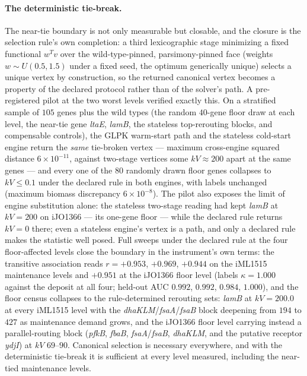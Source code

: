 \documentclass[11pt,a4paper]{article}
\theoremstyle{plain}
\theoremstyle{definition}
\theoremstyle{remark}
\begin{document}
\paragraph{The deterministic tie-break.}
The near-tie boundary is not only measurable but closable, and the
closure is the selection rule's own completion: a third
lexicographic stage minimizing a fixed functional $w^{T}v$ over the
wild-type-pinned, parsimony-pinned face (weights
$w\sim U(0.5,1.5)$ under a fixed seed, the optimum generically
unique) selects a unique vertex by construction, so the returned
canonical vertex becomes a property of the declared protocol rather
than of the solver's path. A pre-registered pilot at the two worst
levels verified exactly this. On a stratified sample of $105$ genes
plus the wild types (the random $40$-gene floor draw at each level,
the near-tie gene \emph{ltaE}, \emph{lamB}, the stateless
top-rerouting blocks, and compensable controls), the GLPK
warm-start path and the stateless cold-start engine return the
\emph{same} tie-broken vertex --- maximum cross-engine squared
distance $6\times10^{-11}$, against two-stage vertices some
$kV\approx200$ apart at the same genes --- and every one of the
$80$ randomly drawn floor genes collapses to $kV\le0.1$ under the
declared rule in both engines, with labels unchanged (maximum
biomass discrepancy $6\times10^{-8}$). The pilot also exposes the
limit of engine substitution alone: the stateless two-stage reading
had kept \emph{lamB} at $kV=200$ on iJO1366 --- its one-gene floor
--- while the declared rule returns $kV=0$ there; even a stateless
engine's vertex is a path, and only a declared rule makes the
statistic well posed. Full sweeps under the declared rule at the
four floor-affected levels close the boundary in the instrument's
own terms: the transitive association reads $r=+0.953$, $+0.969$,
$+0.944$ on the iML1515 maintenance levels and $+0.951$ at the
iJO1366 floor level (labels $\kappa=1.000$ against the deposit at
all four; held-out AUC $0.992$, $0.992$, $0.984$, $1.000$), and the
floor census collapses to the rule-determined rerouting sets:
\emph{lamB} at $kV=200.0$ at every iML1515 level with the
\emph{dhaKLM}/\emph{fsaA}/\emph{fsaB} block deepening from $194$
to $427$ as maintenance demand grows, and the iJO1366 floor level
carrying instead a parallel-routing block (\emph{pfkB},
\emph{fbaB}, \emph{fsaA}/\emph{fsaB}, \emph{dhaKLM}, and the
putative receptor \emph{ydjI}) at $kV$ $69$--$90$. Canonical
selection is necessary everywhere, and with the deterministic
tie-break it is sufficient at every level measured, including the
near-tied maintenance levels.
\end{document}
